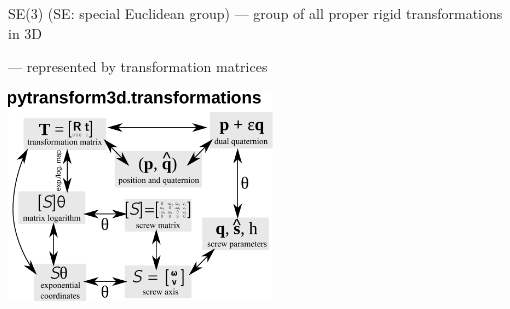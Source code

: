\documentclass[14pt,aspectratio=169]{beamer}
\begin{document}
\begin{frame}{SE(3) (SE: special Euclidean group)}
--- group of all proper rigid transformations in 3D

--- represented by transformation matrices

\vfill

\begin{center}
\includegraphics[width=7cm]{images/transformations}
\end{center}
\end{frame}
\end{document}
